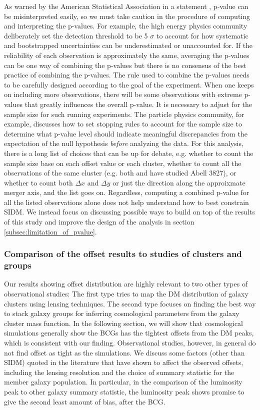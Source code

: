 As warned by the American Statistical Association in a statement \citep{Wasserstein2016},
p-value can be misinterpreted easily, so
we must take caution in the procedure of computing and interpreting the p-values. 
For example, the high energy physics community deliberately set the detection
threshold to be 5 $\sigma$ to account for how systematic and bootstrapped 
uncertainties can be
underestimated or unaccounted for. 
If the reliability of each observation is 
approximately the same, averaging the p-values can be one way of combining the p-values 
but there is no consensus of the best practice of combining the
p-values. The rule used to combine the p-values 
needs to be carefully designed according to the goal of the experiment.
When one keeps on including more observations,  
there will be some observations with extreme p-values that greatly influences the
overall p-value. It is necessary to adjust for the sample size for such running
experiments.   
The particle physics community,
for example, discusses how to set stopping rules \citep{Demortier2007}
to account for the sample size to determine what p-value level should indicate meaningful
discrepancies from the expectation of the null hypothesis {\it before}
analyzing the data. 
For this analysis, there is a long list of choices that can be up for debate, 
e.g. whether to count the sample 
size base on each offset value or each cluster, whether to count all the
observations of the same cluster (e.g. both \citealt{Williams2011a} and
\citealt{Massey2015} have studied Abell 3827), or whether to count both $\Delta x$
and $\Delta y$ or just the direction along the approixmate merger axis, and the
list goes on.
Regardless, computing a combined p-value for all the listed observations alone 
does not help understand how to best constrain SIDM.
We instead focus on discussing possible ways to build on top of the results
of this study and improve the design of the 
analysis in section \ref{subsec:limitation_of_pvalue}. 

\subsubsection{Comparison of the offset results to studies of clusters and groups}
Our results showing offset distribution are highly relevant to two other types of
observational studies: 
The first type tries to map the DM distribution of galaxy clusters 
using lensing techniques. 
The second type focuses on finding the best way to stack galaxy groups for
inferring cosmological parameters from the galaxy cluster mass function.
In the following section, we will show that cosmological simulations generally show 
the BCGs has the tightest offsets from the DM peaks, which is consistent with
our finding.
Observational studies, however, in general do not find offset as tight as the 
simulations. We discuss some factors (other than SIDM) quoted in the literature that 
have shown to affect the observed offsets, including the lensing resolution and the
choice of summary statistic for the member galaxy population. In particular, 
in the comparison of the luminosity peak to other galaxy summary statistic,
the luminosity peak shows promise to give the second least amount of bias,
after the BCG. 
 
